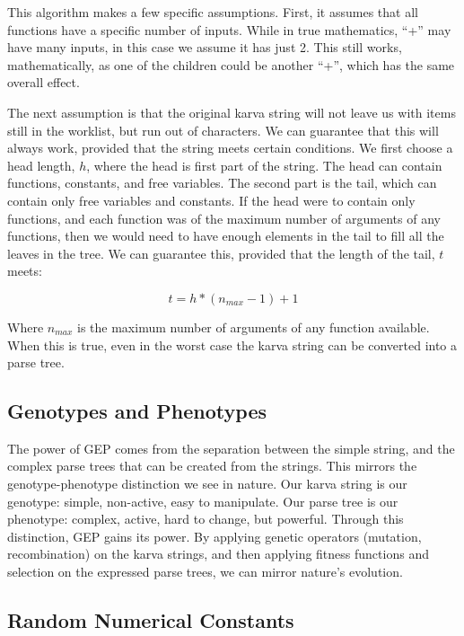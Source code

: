 \documentclass[a4paper,11pt]{report}
\begin{document}
This algorithm makes a few specific assumptions. First, it assumes that all functions have a specific number of 
inputs. While in true mathematics, ``+'' may have many inputs, in this case we assume it has just 2. This still 
works, mathematically, as one of the children could be another ``+'', which has the same overall effect. 

The next assumption is that the original karva string will not leave us with items still in the worklist, but run out  
of characters. We can guarantee that this will always work, provided that the string meets certain conditions. 
We first choose a head length, $h$, where the head is first part of the string. The head can contain functions, 
constants, and free variables. The second part is the tail, which can contain only free variables and constants. 
If the head were to contain only functions, and each function was of the maximum number of arguments of any functions, 
then we would need to have enough elements in the tail to fill all the leaves in the tree. We can guarantee this, 
provided that the length of the tail, $t$ meets:

\[ t = h * (n_{max} - 1) + 1 \]

Where $n_{max}$ is the maximum number of arguments of any function available. When this is true, even in the worst 
case the karva string can be converted into a parse tree. 

\subsection{Genotypes and Phenotypes}
The power of GEP comes from the separation between the simple string, and the complex parse trees that 
can be created from the strings. This mirrors the genotype-phenotype distinction we see in nature. Our 
karva string is our genotype: simple, non-active, easy to manipulate. Our parse tree is our phenotype: 
complex, active, hard to change, but powerful. Through this distinction, GEP gains its power.
By applying genetic operators (mutation, recombination) on the karva strings, and then applying 
fitness functions and selection on the expressed parse trees, we can mirror nature's evolution. 

\subsection{Random Numerical Constants}
\end{document}
